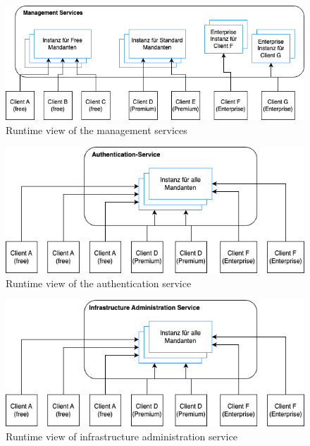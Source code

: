 \begin{figure}[ht]
  \centering
  \includegraphics[width=\textwidth]{resources/03-runtime-view/management.png}
  \caption{Runtime view of the management services}
  \label{fig:03-management}
\end{figure}

\begin{figure}[ht]
  \centering
  \includegraphics[width=\textwidth]{resources/03-runtime-view/authentication.drawio.png}
  \caption{Runtime view of the authentication service}
  \label{fig:03-authentication}
\end{figure}

\begin{figure}[ht]
  \centering
  \includegraphics[width=\textwidth]{resources/03-runtime-view/infrastructure-administration.png}
  \caption{Runtime view of infrastructure administration service}
  \label{fig:03-infrastructure-administration}
\end{figure}

